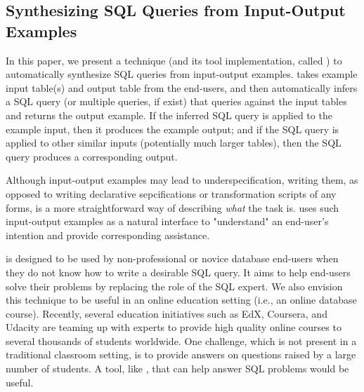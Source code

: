 \subsection{Synthesizing SQL Queries from Input-Output Examples}


In this paper, we present a technique (and its tool
implementation, called \ourtool) to automatically synthesize SQL queries
from input-output examples. \ourtool takes example input
table(s) and output table from the end-users, and then automatically
infers a SQL query (or multiple queries, if exist) that queries
against the input tables and returns the output example. If the inferred
SQL query is applied
to the example input, then it produces the example output; and if the
SQL query is applied to other similar inputs (potentially much larger tables),
then the SQL query produces a corresponding output.


Although input-output examples may lead to
underspecification, writing them, as opposed to writing
declarative sepcifications or transformation scripts of any forms,
is a more straightforward way of describing \textit{what} the
task is. \ourtool uses such input-output examples
as a natural interface to "understand" an end-user's intention
and provide corresponding assistance.


\ourtool is designed to be used by non-professional or novice database
end-users when they do not know how
to write a desirable SQL query. It aims to help end-users
solve their problems by replacing the role of the SQL expert.
We also envision this technique to be useful in an online education
setting (i.e., an online database course). Recently, several
education initiatives such as EdX, Coursera,
and Udacity are teaming up with experts to provide
high quality online courses
to several thousands of students worldwide.
One challenge, which is not present in a traditional classroom
setting, is to provide answers on questions raised by a large
number of students. A tool, like \ourtool,
that can help answer SQL problems would be useful.


